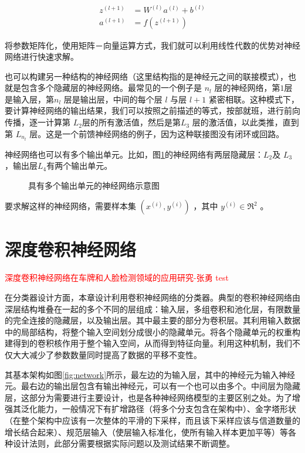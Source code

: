  \begin{align}
z^{(l+1)} &= W^{(l)} a^{(l)} + b^{(l)}   \\
a^{(l+1)} &= f(z^{(l+1)})
\end{align}

将参数矩阵化，使用矩阵－向量运算方式，我们就可以利用线性代数的优势对神经网络进行快速求解。

也可以构建另一种结构的神经网络（这里结构指的是神经元之间的联接模式），也就是包含多个隐藏层的神经网络。最常见的一个例子是 $  n_l$ 层的神经网络，第$   1 $层是输入层，第$   n_l$ 层是输出层，中间的每个层 $  l$ 与层 $  l+1$ 紧密相联。这种模式下，要计算神经网络的输出结果，我们可以按照之前描述的等式，按部就班，进行前向传播，逐一计算第 $  L_2 $层的所有激活值，然后是第$  L_3$ 层的激活值，以此类推，直到第 $  L_{n_l}$ 层。这是一个前馈神经网络的例子，因为这种联接图没有闭环或回路。

神经网络也可以有多个输出单元。比如，图\ref{fig:network2}的神经网络有两层隐藏层：$  L_2 $及 $ L_3$ ，输出层$  L_4 $有两个输出单元。

\begin{figure}
  \centering
  
  \caption{具有多个输出单元的神经网络示意图}
  \label{fig:network2}  
\end{figure}

要求解这样的神经网络，需要样本集  $ (x^{(i)}, y^{(i)})$ ，其中 $ y^{(i)} \in \Re^2$ 。
\section{深度卷积神经网络}
\textcolor{red}{深度卷积神经网络在车牌和人脸检测领域的应用研究-张勇 test}

在分类器设计方面，本章设计利用卷积神经网络的分类器。典型的卷积神经网络由深层结构堆叠在一起的多个不同的层组成：输入层，多组卷积和池化层，有限数量的完全连接的隐藏层，以及输出层。其中最主要的部分为卷积层。其利用输入数据中的局部结构，将整个输入空间划分成很小的隐藏单元。将各个隐藏单元的权重构建得到的卷积核作用于整个输入空间，从而得到特征向量。利用这种机制，我们不仅大大减少了参数数量同时提高了数据的平移不变性。
  
其基本架构如图\ref{fig:network}所示，最左边的为输入层，其中的神经元为输入神经元。最右边的输出层包含有输出神经元，可以有一个也可以由多个。中间层为隐藏层，这部分为需要进行主要设计，也是各种神经网络模型的主要区别之处。为了增强其泛化能力，一般情况下有扩增路径（将多个分支包含在架构中）、金字塔形状（在整个架构中应该有一次整体的平滑的下采样，而且该下采样应该与信道数量的增长结合起来）、规范层输入（使层输入标准化，使所有输入样本更加平等）等各种设计法则，此部分需要根据实际问题以及测试结果不断调整。

